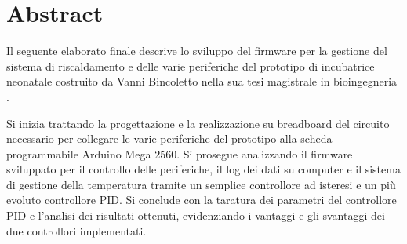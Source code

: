 \chapter*{Abstract}
Il seguente elaborato finale descrive lo sviluppo del firmware per la gestione del sistema di riscaldamento e delle varie
periferiche del prototipo di incubatrice neonatale costruito da Vanni Bincoletto nella sua tesi magistrale in bioingegneria
\cite{bincoletto2025}.

Si inizia trattando la progettazione e la realizzazione su breadboard del circuito necessario per collegare le varie periferiche
del prototipo alla scheda programmabile Arduino Mega 2560. Si prosegue analizzando il firmware sviluppato per il controllo
delle periferiche, il log dei dati su computer e il sistema di gestione della temperatura tramite un semplice controllore
ad isteresi e un più evoluto controllore PID. Si conclude con la taratura dei parametri del controllore PID e l'analisi
dei risultati ottenuti, evidenziando i vantaggi e gli svantaggi dei due controllori implementati.
